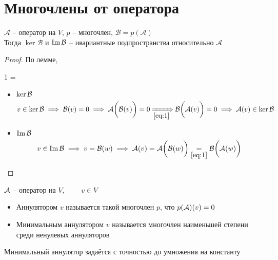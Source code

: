 \section{Многочлены от оператора}

\begin{theorem}
	$ \mathcal{A} $ -- оператор на $ V $, $ p $ -- многочлен, $ \mathcal{B} = p(\mathcal{A}) $ \\
	Тогда $ \ker \mathcal{B} $ и $ \operatorname{Im} \mathcal{B} $ -- ивариантные подпространства относительно $ \mathcal{A} $
\end{theorem}

\begin{proof}
	По лемме,
	\begin{equ}1
		 \circ \mc{B} =  \circ {}
	\end{equ}
	\begin{itemize}
		\item $ \ker \mathcal{B} $
		$$ v \in \ker \mc{B} \implies \mc{B}(v) = 0 \implies \mc{A} \bigg( \mc{B}(v) \bigg) = 0 \underimp{\eref1} \mc{B} \bigg( \mc{A}(v) \bigg) = 0 \implies \mc{A}(v) \in \ker \mc{B} $$
		\item $ \operatorname{Im} \mathcal{B} $
		$$ v \in \Img \mc{B} \implies v = \mc{B}(w) \implies \mc{A}(v) = \mc{A} \bigg( \mc{B}(w) \bigg) \underset{\eref1}= \mc{B} \bigg( \mc{A}(w) \bigg) $$
	\end{itemize}
\end{proof}

\begin{definition}
	$ \mathcal{A} $ -- оператор на $ V $, $ \qquad v \in V $
	\begin{itemize}
		\item Аннулятором $ v $ называется такой многочлен $ p $, что $ p(\mathcal{A})(v) = 0 $
		\item Минимальным аннулятором $ v $ называется многочлен наименьшей степени среди ненулевых аннуляторов
	\end{itemize}
\end{definition}

\begin{remark}
	Минимальный аннулятор задаётся с точностью до умножения на константу
\end{remark}


